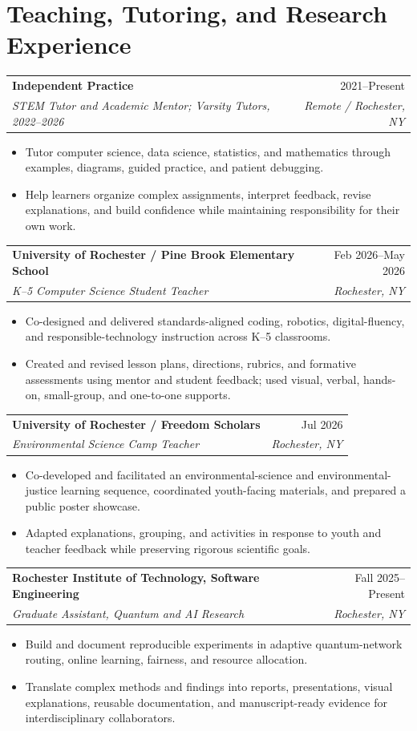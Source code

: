 \documentclass[10pt,letterpaper]{article}
\makeatletter
\newcommand{\entry}[4]{%
  \noindent\begin{tabularx}{\textwidth}{@{}Xr@{}}
    \textbf{#1} & #2 \\
    \textit{#3} & \textit{#4}
  \end{tabularx}\vspace{-1pt}
}
\makeatother
\begin{document}
\section*{Teaching, Tutoring, and Research Experience}

\entry{Independent Practice}{2021--Present}{STEM Tutor and Academic Mentor; Varsity Tutors, 2022--2026}{Remote / Rochester, NY}
\begin{itemize}
  \item Tutor computer science, data science, statistics, and mathematics through examples, diagrams, guided practice, and patient debugging.
  \item Help learners organize complex assignments, interpret feedback, revise explanations, and build confidence while maintaining responsibility for their own work.
\end{itemize}

\entry{University of Rochester / Pine Brook Elementary School}{Feb 2026--May 2026}{K--5 Computer Science Student Teacher}{Rochester, NY}
\begin{itemize}
  \item Co-designed and delivered standards-aligned coding, robotics, digital-fluency, and responsible-technology instruction across K--5 classrooms.
  \item Created and revised lesson plans, directions, rubrics, and formative assessments using mentor and student feedback; used visual, verbal, hands-on, small-group, and one-to-one supports.
\end{itemize}

\entry{University of Rochester / Freedom Scholars}{Jul 2026}{Environmental Science Camp Teacher}{Rochester, NY}
\begin{itemize}
  \item Co-developed and facilitated an environmental-science and environmental-justice learning sequence, coordinated youth-facing materials, and prepared a public poster showcase.
  \item Adapted explanations, grouping, and activities in response to youth and teacher feedback while preserving rigorous scientific goals.
\end{itemize}

\entry{Rochester Institute of Technology, Software Engineering}{Fall 2025--Present}{Graduate Assistant, Quantum and AI Research}{Rochester, NY}
\begin{itemize}
  \item Build and document reproducible experiments in adaptive quantum-network routing, online learning, fairness, and resource allocation.
  \item Translate complex methods and findings into reports, presentations, visual explanations, reusable documentation, and manuscript-ready evidence for interdisciplinary collaborators.
\end{itemize}
\end{document}
